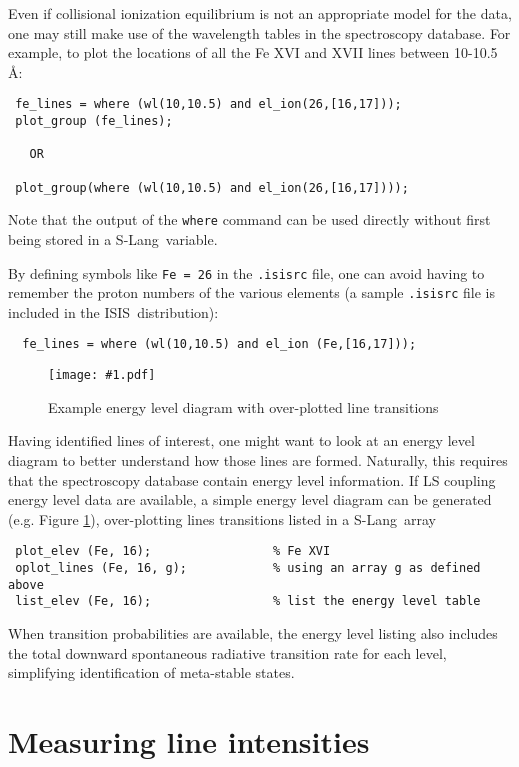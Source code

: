 \documentclass{book}
\newcommand{\putfig}[1]{\texttt{[image: \#1.pdf]}}
\newcommand{\putfig}[1]{\psfig{file=#1.ps}}
\newcommand{\isisx}{{\sc ISIS~}}
\newcommand{\slang}{{\sc S-Lang}}
\begin{document}
{Even if collisional ionization equilibrium is not an appropriate model for
the data, one may still make use of the wavelength tables in the
spectroscopy database.  For example, to plot the locations of all the Fe XVI
and XVII lines between 10-10.5 \AA:
 \begin{verbatim}
 fe_lines = where (wl(10,10.5) and el_ion(26,[16,17]));
 plot_group (fe_lines);

   OR

 plot_group(where (wl(10,10.5) and el_ion(26,[16,17])));
 \end{verbatim}
Note that the output of the {\tt where} command can be used directly without
first being stored in a \slang\ variable.

By defining symbols like {\tt Fe = 26} in the {\tt .isisrc} file, one can
avoid having to remember the proton numbers of the various elements (a
sample {\tt .isisrc} file is included in the \isisx distribution):
 \begin{verbatim}
  fe_lines = where (wl(10,10.5) and el_ion (Fe,[16,17]));
 \end{verbatim}

\begin{figure}[ht]
\putfig{figures/elev}
\caption{Example energy level diagram with over-plotted line transitions}
\label{fig:elev}
\end{figure}

Having identified lines of interest, one might want to look at an energy
level diagram to better understand how those lines are formed. Naturally,
this requires that the spectroscopy database contain energy level
information. If LS coupling energy level data are available, a simple energy
level diagram can be generated (e.g. Figure \ref{fig:elev}), over-plotting
lines transitions listed in a \slang\ array
 \begin{verbatim}
 plot_elev (Fe, 16);                 % Fe XVI
 oplot_lines (Fe, 16, g);            % using an array g as defined above
 list_elev (Fe, 16);                 % list the energy level table
 \end{verbatim}
When transition probabilities are available, the energy level listing also
includes the total downward spontaneous radiative transition rate for each
level, simplifying identification of meta-stable states.

\section{Measuring line intensities}

}
\end{document}
